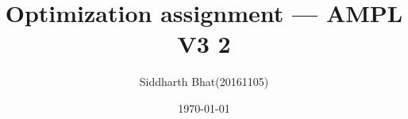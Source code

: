 \documentclass[11pt]{article}
\author{Siddharth Bhat(20161105)}
\title{Optimization assignment --- AMPL V3 2}
\date{\today}
\begin{document}
\maketitle
\inputminted[fontsize=\footnotesize]{ampl}{solution.mod}
\begin{figure}[!htb]
    \begin{minipage}{0.5\textwidth}
        \centering
        \inputminted[fontsize=\footnotesize]{ampl}{solution.dat}
    \end{minipage}
    \begin{minipage}{0.5\textwidth}
        \centering
        \inputminted[fontsize=\footnotesize]{ampl}{solution.run}
    \end{minipage}
\end{figure}
\inputminted[fontsize=\tiny]{text}{solution.output}
\thispagestyle{fancy}
\end{document}
